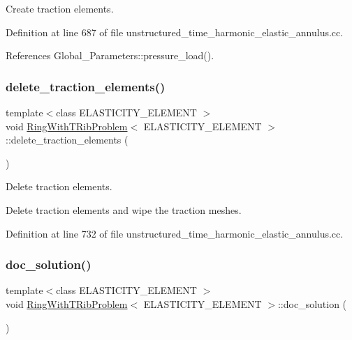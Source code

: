 Create traction elements. 



Definition at line 687 of file unstructured\+\_\+time\+\_\+harmonic\+\_\+elastic\+\_\+annulus.\+cc.



References Global\+\_\+\+Parameters\+::pressure\+\_\+load().

\mbox{\label{classRingWithTRibProblem_aa85169a96623cb39f18111ee436f5b9d}} 
\subsubsection{\texorpdfstring{delete\+\_\+traction\+\_\+elements()}{delete\_traction\_elements()}}
{\footnotesize\ttfamily template$<$class E\+L\+A\+S\+T\+I\+C\+I\+T\+Y\+\_\+\+E\+L\+E\+M\+E\+NT $>$ \\
void \hyperlink{classRingWithTRibProblem}{Ring\+With\+T\+Rib\+Problem}$<$ E\+L\+A\+S\+T\+I\+C\+I\+T\+Y\+\_\+\+E\+L\+E\+M\+E\+NT $>$\+::delete\+\_\+traction\+\_\+elements (\begin{DoxyParamCaption}{ }\end{DoxyParamCaption})\hspace{0.3cm}{\ttfamily [private]}}



Delete traction elements. 

Delete traction elements and wipe the traction meshes. 

Definition at line 732 of file unstructured\+\_\+time\+\_\+harmonic\+\_\+elastic\+\_\+annulus.\+cc.

\mbox{\label{classRingWithTRibProblem_a43b70b125f467aa5bb9c74d08f193aa5}} 
\subsubsection{\texorpdfstring{doc\+\_\+solution()}{doc\_solution()}}
{\footnotesize\ttfamily template$<$class E\+L\+A\+S\+T\+I\+C\+I\+T\+Y\+\_\+\+E\+L\+E\+M\+E\+NT $>$ \\
void \hyperlink{classRingWithTRibProblem}{Ring\+With\+T\+Rib\+Problem}$<$ E\+L\+A\+S\+T\+I\+C\+I\+T\+Y\+\_\+\+E\+L\+E\+M\+E\+NT $>$\+::doc\+\_\+solution (\begin{DoxyParamCaption}{ }\end{DoxyParamCaption})}



